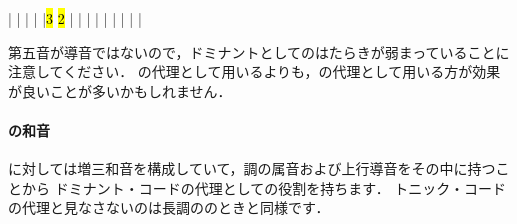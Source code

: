 \documentclass[dvipdfmx,uplatex,b5paper,openany,jbase=12Q,nomag*,textwidth-limit=44%
               ]{gachimuchi}[2020/05/05]
\begin{document}
\begin{floatMusic}[pos=ht]
  \Startpiece%
  \znotes|\en
  \NOTes
  |%
  \en\bar
  \NOTEs
  |%
  \en\doublebar
  \NOTes
  |\hl{3}%
  \hl{2}%
  \en\bar
  \NOTEs
  |%
  \en\doublebar
  \NOTes
  |%
  \en\bar
  \NOTEs
  |%
  \en\doublebar
  \znotes|\en
  \NOTes
  \zchordsl{\Mdline}%
  |%
  \en\bar
  \NOTes
  \Mryaku\sk%
  |\Mryaku\sk%
  \en\setdoublebar
  \endpiece%
\end{floatMusic}

第五音が導音ではないので，ドミナントとしてのはたらきが弱まっていることに注意してください．
の代理として用いるよりも，の代理として用いる方が効果が良いことが多いかもしれません．

\paragraph{\bFlat\Gniii\Aug の和音}
\bFlat\Gniii に対して\bFlat\Gniii\Aug は増三和音を構成していて，調の属音および上行導音をその中に持つことから
ドミナント・コードの代理としての役割を持ちます．
トニック・コードの代理と見なさないのは長調の\bFlat\Gnvi\Aug のときと同様です．
\end{document}
